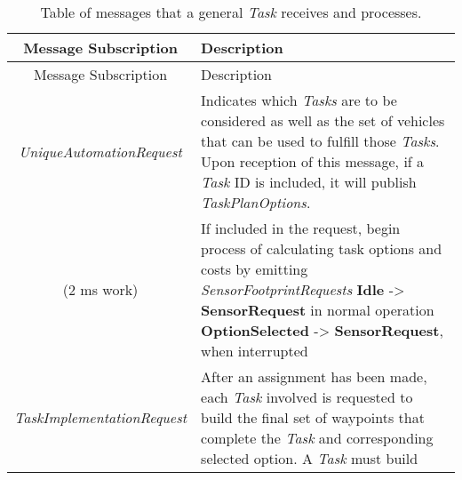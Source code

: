 \begin{longtable}[]{@{}cl@{}}
\caption{Table of messages that a general \emph{Task} receives and
processes.}\tabularnewline
\toprule
\begin{minipage}[b]{0.40\columnwidth}\centering\strut
Message Subscription\strut
\end{minipage} & \begin{minipage}[b]{0.55\columnwidth}\raggedright\strut
Description\strut
\end{minipage}\tabularnewline
\midrule
\endfirsthead
\toprule
\begin{minipage}[b]{0.40\columnwidth}\centering\strut
Message Subscription\strut
\end{minipage} & \begin{minipage}[b]{0.55\columnwidth}\raggedright\strut
Description\strut
\end{minipage}\tabularnewline
\midrule
\endhead
\begin{minipage}[t]{0.40\columnwidth}\centering\strut
\emph{UniqueAutomationRequest}\strut
\end{minipage} & \begin{minipage}[t]{0.55\columnwidth}\raggedright\strut
Indicates which \emph{Tasks} are to be considered as well as the set of
vehicles that can be used to fulfill those \emph{Tasks}. Upon reception
of this message, if a \emph{Task} ID is included, it will publish
\emph{TaskPlanOptions}.\strut
\end{minipage}\tabularnewline
\begin{minipage}[t]{0.40\columnwidth}\centering\strut
(2 ms work)\strut
\end{minipage} & \begin{minipage}[t]{0.55\columnwidth}\raggedright\strut
If included in the request, begin process of calculating task options
and costs by emitting \emph{SensorFootprintRequests} \textbf{Idle}
-\textgreater{} \textbf{SensorRequest} in normal operation
\textbf{OptionSelected} -\textgreater{} \textbf{SensorRequest}, when
interrupted\strut
\end{minipage}\tabularnewline
\begin{minipage}[t]{0.40\columnwidth}\centering\strut
\emph{TaskImplementationRequest}\strut
\end{minipage} & \begin{minipage}[t]{0.55\columnwidth}\raggedright\strut
After an assignment has been made, each \emph{Task} involved is
requested to build the final set of waypoints that complete the
\emph{Task} and corresponding selected option. A \emph{Task} must build

\end{minipage}
\end{longtable}
